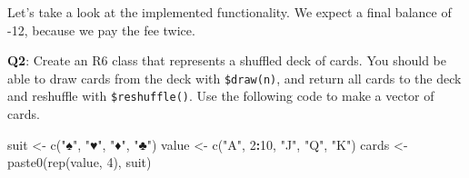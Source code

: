 \documentclass[
]{krantz}
\makeatletter
\newenvironment{Shaded}{\begin{snugshade}}{\end{snugshade}}
\newcommand{\CommentTok}[1]{\textcolor[rgb]{0.56,0.35,0.01}{\textit{#1}}}
\newcommand{\ControlFlowTok}[1]{\textcolor[rgb]{0.13,0.29,0.53}{\textbf{#1}}}
\newcommand{\DataTypeTok}[1]{\textcolor[rgb]{0.13,0.29,0.53}{#1}}
\newcommand{\DecValTok}[1]{\textcolor[rgb]{0.00,0.00,0.81}{#1}}
\newcommand{\KeywordTok}[1]{\textcolor[rgb]{0.13,0.29,0.53}{\textbf{#1}}}
\newcommand{\NormalTok}[1]{#1}
\newcommand{\OperatorTok}[1]{\textcolor[rgb]{0.81,0.36,0.00}{\textbf{#1}}}
\newcommand{\StringTok}[1]{\textcolor[rgb]{0.31,0.60,0.02}{#1}}
\newenvironment{kframe}{%
\medskip{}
\setlength{\fboxsep}{.8em}
 \def\at@end@of@kframe{}%
 \ifinner\ifhmode%
  \def\at@end@of@kframe{\end{minipage}}%
  \begin{minipage}{\columnwidth}%
 \fi\fi%
 \def\FrameCommand##1{\hskip\@totalleftmargin \hskip-\fboxsep
 \colorbox{shadecolor}{##1}\hskip-\fboxsep
     \hskip-\linewidth \hskip-\@totalleftmargin \hskip\columnwidth}%
 \MakeFramed {\advance\hsize-\width
   \@totalleftmargin\z@ \linewidth\hsize
   \@setminipage}}%
 {\par\unskip\endMakeFramed%
 \at@end@of@kframe}
\renewenvironment{Shaded}{\begin{kframe}}{\end{kframe}}
\renewcommand{\KeywordTok} [1]{\textcolor[rgb]{0.00,0.44,0.13}{{#1}}}
\renewcommand{\DataTypeTok}[1]{\textcolor[rgb]{0.56,0.13,0.00}{{#1}}}
\renewcommand{\DecValTok}  [1]{\textcolor[rgb]{0.25,0.63,0.44}{{#1}}}
\renewcommand{\StringTok}  [1]{\textcolor[rgb]{0.25,0.44,0.63}{{#1}}}
\renewcommand{\CommentTok} [1]{\textcolor[rgb]{0.38,0.63,0.69}{{#1}}}
\renewcommand{\NormalTok}  [1]{{#1}}
\makeatother
\begin{document}
\begin{Shaded}
\end{Shaded}

Let's take a look at the implemented functionality. We expect a final balance of -12, because we pay the fee twice.

\begin{Shaded}
\end{Shaded}

\textbf{{Q2}}: Create an R6 class that represents a shuffled deck of cards. You should be able to draw cards from the deck with \texttt{\$draw(n)}, and return all cards to the deck and reshuffle with \texttt{\$reshuffle()}. Use the following code to make a vector of cards.

\begin{Shaded}
\begin{Highlighting}[]
\NormalTok{suit <-}\StringTok{ }\KeywordTok{c}\NormalTok{(}\StringTok{"♠"}\NormalTok{, }\StringTok{"♥"}\NormalTok{, }\StringTok{"♦"}\NormalTok{, }\StringTok{"♣"}\NormalTok{)}
\NormalTok{value <-}\StringTok{ }\KeywordTok{c}\NormalTok{(}\StringTok{"A"}\NormalTok{, }\DecValTok{2}\OperatorTok{:}\DecValTok{10}\NormalTok{, }\StringTok{"J"}\NormalTok{, }\StringTok{"Q"}\NormalTok{, }\StringTok{"K"}\NormalTok{)}
\NormalTok{cards <-}\StringTok{ }\KeywordTok{paste0}\NormalTok{(}\KeywordTok{rep}\NormalTok{(value, }\DecValTok{4}\NormalTok{), suit)}
\end{Highlighting}
\end{Shaded}
\end{document}
